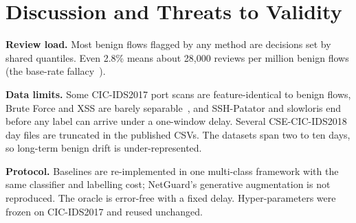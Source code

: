 \section{Discussion and Threats to Validity}
\label{sec:discussion}

\textbf{Review load.} Most benign flows flagged by any method are \unk{} decisions set by shared quantiles. Even
2.8\% means about 28{,}000 reviews per million benign flows (the base-rate fallacy~\cite{arp2022dos}).

\textbf{Data limits.} Some CIC-IDS2017 port scans are feature-identical to benign flows, Brute Force and XSS are
barely separable~\cite{engelen2021troubleshooting}, and SSH-Patator and slowloris end before any label can arrive
under a one-window delay. Several CSE-CIC-IDS2018 day files are truncated in the published CSVs. The datasets span
two to ten days, so long-term benign drift is under-represented.

\textbf{Protocol.} Baselines are re-implemented in one multi-class framework with the same classifier and
labelling cost; NetGuard's generative augmentation is not reproduced. The oracle is error-free with a fixed delay.
Hyper-parameters were frozen on CIC-IDS2017 and reused unchanged.
